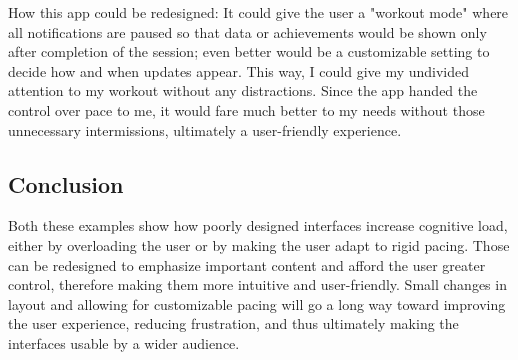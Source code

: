 \documentclass[
	letterpaper, %
]{jdf}
\begin{document}
How this app could be redesigned: It could give the user a "workout mode" where all notifications are paused so that data or achievements would be shown only after completion of the session; even better would be a customizable setting to decide how and when updates appear. This way, I could give my undivided attention to my workout without any distractions. Since the app handed the control over pace to me, it would fare much better to my needs without those unnecessary intermissions, ultimately a user-friendly experience.

\subsection{Conclusion}

Both these examples show how poorly designed interfaces increase cognitive load, either by overloading the user or by making the user adapt to rigid pacing. Those can be redesigned to emphasize important content and afford the user greater control, therefore making them more intuitive and user-friendly. Small changes in layout and allowing for customizable pacing will go a long way toward improving the user experience, reducing frustration, and thus ultimately making the interfaces usable by a wider audience.



\newpage

\newpage
\end{document}
